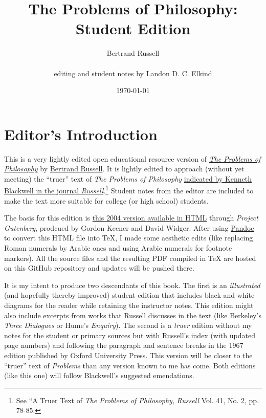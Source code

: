\documentclass[oneside,letterpaper,12pt]{book}
\begin{document}
\title{The Problems of Philosophy: Student Edition}
\author{Bertrand Russell \\ \\ editing and student notes by Landon D. C. Elkind}
\date{\today}

\frontmatter

\maketitle

\chapter*{Editor's Introduction}
This is a very lightly edited open educational resource version of \href{https://archive.org/details/theproblemsofphi00russuoft}{\emph{The Problems of Philosophy}} by \href{https://bertrandrussellsociety.org/bertrand-russell/}{Bertrand Russell}. It is lightly edited to approach (without yet meeting) the ``truer'' text of \emph{The Problems of Philosophy} \href{https://mulpress.mcmaster.ca/russelljournal/article/view/4810}{indicated by Kenneth Blackwell in the journal \emph{Russell}}.\footnote{See ``A Truer Text of \emph{The Problems of Philosophy}, \emph{Russell} Vol. 41, No. 2, pp. 78-85.} Student notes from the editor are included to make the text more suitable for college (or high school) students. 

The basis for this edition is \href{https://www.gutenberg.org/cache/epub/5827/pg5827-images.html}{this 2004 version available in HTML} through \emph{Project Gutenberg}, prodcued by Gordon Keener and David Widger. After using \href{https://pandoc.org/}{Pandoc} to convert this HTML file into TeX, I made some aesthetic edits (like replacing Roman numerals by Arabic ones and using Arabic numerals for footnote markers). All the source files and the resulting PDF compiled in TeX are hosted on this GitHub repository and updates will be pushed there.

It is my intent to produce two descendants of this book. The first is an \emph{illustrated} (and hopefully thereby improved) student edition that includes black-and-white diagrams for the reader while retaining the instructor notes. This edition might also include excerpts from works that Russell discusses in the text (like Berkeley's \emph{Three Dialogues} or Hume's \emph{Enquiry}). The second is a \emph{truer} edition without my notes for the student or primary sources but with Russell's index (with updated page numbers) and following the paragraph and sentence breaks in the 1967 edition published by Oxford University Press. This version will be closer to the ``truer'' text of \emph{Problems} than any version known to me has come. Both editions (like this one) will follow Blackwell's suggested emendations.
\end{document}
